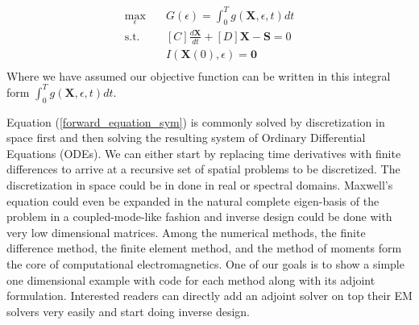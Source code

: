 \documentclass{tufte-handout}
\begin{document}
  \begin{equation}\label{opt_problem}
  \begin{aligned}
  \max_{\epsilon} \quad & G(\epsilon) = \int^T_0 g(\mathbf{X},\epsilon,t) dt \\
  \textrm{s.t.} \quad & [C] \frac{d \mathbf{X}}{dt} + [D] \mathbf{X} - \mathbf{S} = 0\\
  &I(\mathbf{X}(0),\epsilon) = \mathbf{0}   \\
  \end{aligned}
  \end{equation}
 Where we have assumed our objective function can be written in this integral form $\int^T_0 g(\mathbf{X},\epsilon,t) dt$. 
 
 Equation (\ref{forward_equation_sym}) is  commonly solved by discretization  in space first and then solving the resulting system of Ordinary Differential Equations (ODEs). We can either start by replacing time derivatives with finite differences to arrive at a recursive set of spatial problems to be discretized. The discretization in space could be in done in real or spectral domains. Maxwell's equation could even be expanded in the natural complete eigen-basis of the problem in a coupled-mode-like fashion and inverse design could be done with very low dimensional matrices.   Among the numerical methods, the finite difference method, the finite element
 method, and the method of moments form the core of computational electromagnetics. One of our goals is to show a simple one dimensional example with code for each method  along with its adjoint formulation. Interested readers can directly add an adjoint solver on top their EM solvers very easily and start doing inverse design. 
\end{document}
